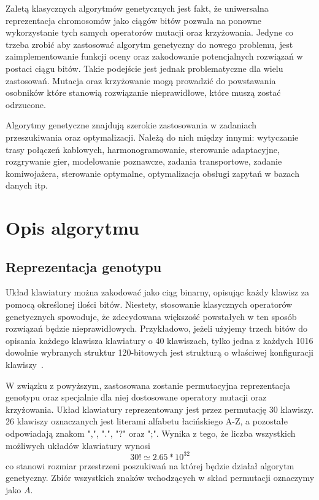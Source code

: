 \documentclass[brudnopis]{xmgr}
\begin{document}
Zaletą klasycznych algorytmów genetycznych jest fakt, że uniwersalna reprezentacja chromosomów jako ciągów bitów pozwala na ponowne wykorzystanie tych samych operatorów mutacji oraz krzyżowania. Jedyne co trzeba zrobić aby zastosować algorytm genetyczny do nowego problemu, jest zaimplementowanie funkcji oceny oraz zakodowanie potencjalnych rozwiązań w postaci ciągu bitów. Takie podejście jest jednak problematyczne dla wielu zastosowań. Mutacja oraz krzyżowanie mogą prowadzić do powstawania osobników które stanowią rozwiązanie nieprawidłowe, które muszą zostać odrzucone.

Algorytmy genetyczne znajdują szerokie zastosowania w zadaniach przeszukiwania oraz optymalizacji. Należą do nich między innymi: wytyczanie trasy połączeń kablowych, harmonogramowanie, sterowanie adaptacyjne, rozgrywanie gier, modelowanie poznawcze, zadania transportowe, zadanie komiwojażera, sterowanie optymalne, optymalizacja obsługi zapytań w bazach danych itp.\cite{Michalewicz:2003:AGSDPE}


\chapter{Opis algorytmu}


\section{Reprezentacja genotypu}

Układ klawiatury można zakodować jako ciąg binarny, opisując każdy klawisz za pomocą określonej ilości bitów. Niestety, stosowanie klasycznych operatorów genetycznych spowoduje, że zdecydowana większość powstałych w ten sposób rozwiązań będzie nieprawidłowych. Przykładowo, jeżeli użyjemy trzech bitów do opisania każdego klawisza klawiatury o 40 klawiszach, tylko jedna z każdych 1016 dowolnie wybranych struktur 120-bitowych jest strukturą o właściwej konfiguracji klawiszy~\cite{GloverKey}.

W związku z powyższym, zastosowana zostanie permutacyjna reprezentacja genotypu oraz specjalnie dla niej dostosowane operatory mutacji oraz krzyżowania. Układ klawiatury reprezentowany jest przez permutację 30 klawiszy. 26 klawiszy oznaczanych jest literami alfabetu łacińskiego A-Z, a pozostałe odpowiadają znakom ",", ".", "?" oraz ";". Wynika z tego, że liczba wszystkich możliwych układów klawiatury wynosi $$ 30! \simeq 2.65 * 10^{32} $$ co stanowi rozmiar przestrzeni poszukiwań na której będzie działał algorytm genetyczny. Zbiór wszystkich znaków wchodzących w skład permutacji oznaczymy jako $ A $.
\end{document}
